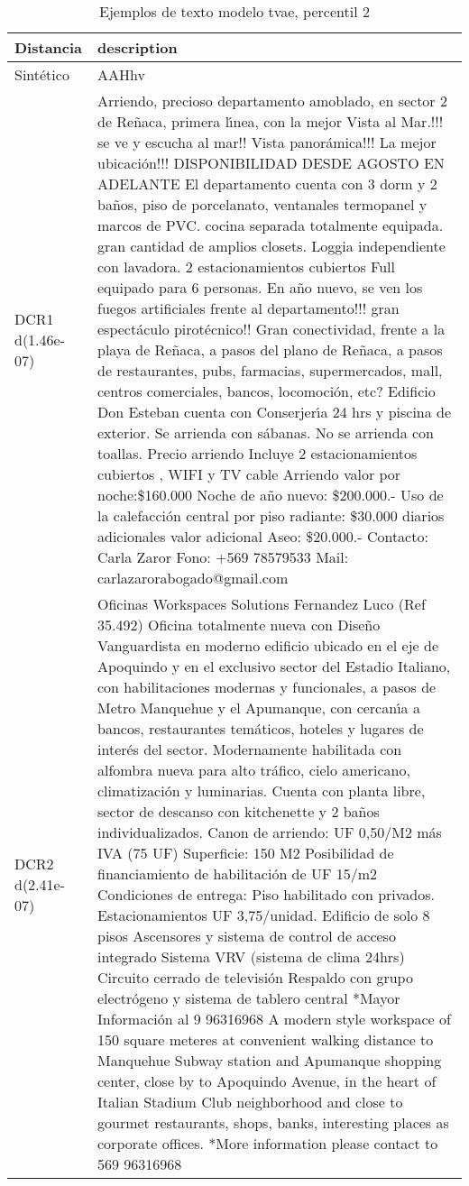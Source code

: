 \begin{table}[H]
\centering
\fontsize{10}{14}\selectfont
\caption{Ejemplos de texto modelo tvae, percentil 2}
\label{table-example-economicos-a-1-tvae-2p-text}
\begin{tabular}{|l|m{35em}|}
\hline
\rowcolor[gray]{0.8}
Distancia & description \\
\hline Sintético & AAHhv \\
\hline DCR1 d(1.46e-07) & Arriendo, precioso departamento amoblado, en sector 2 de Re\~naca, primera l{\'\i}nea, con la mejor Vista al Mar.!!! se ve y escucha al mar!! Vista panor\'amica!!! La mejor ubicaci\'on!!! DISPONIBILIDAD DESDE AGOSTO EN ADELANTE El departamento cuenta con 3 dorm y 2 ba\~nos, piso de porcelanato, ventanales termopanel y marcos de PVC. cocina separada totalmente equipada. gran cantidad de amplios closets. Loggia independiente con lavadora. 2 estacionamientos cubiertos Full equipado para 6 personas. En a\~no nuevo, se ven los fuegos artificiales frente al departamento!!! gran espect\'aculo pirot\'ecnico!! Gran conectividad, frente a la playa de Re\~naca, a pasos del plano de Re\~naca, a pasos de restaurantes, pubs, farmacias, supermercados, mall, centros comerciales, bancos, locomoci\'on, etc?  Edificio Don Esteban cuenta con Conserjer{\'\i}a 24 hrs y piscina de exterior.  Se arrienda con s\'abanas.  No se arrienda con toallas.  Precio arriendo Incluye 2 estacionamientos cubiertos , WIFI y TV cable  Arriendo valor por noche:\$160.000  Noche de a\~no nuevo: \$200.000.-  Uso de la calefacci\'on central por piso radiante: \$30.000 diarios adicionales  valor adicional Aseo: \$20.000.-  Contacto: Carla Zaror Fono: +569 78579533 Mail: carlazarorabogado@gmail.com \\
\hline DCR2 d(2.41e-07) & Oficinas Workspaces Solutions Fernandez Luco (Ref 35.492)  Oficina totalmente nueva con Dise\~no Vanguardista en moderno edificio ubicado en el eje de Apoquindo y en el exclusivo sector del Estadio Italiano, con habilitaciones modernas y funcionales, a pasos de Metro Manquehue y el Apumanque, con cercan{\'\i}a a bancos, restaurantes tem\'aticos, hoteles y lugares de inter\'es del sector. Modernamente habilitada con alfombra nueva para alto tr\'afico, cielo americano, climatizaci\'on y luminarias. Cuenta con planta libre, sector de descanso con kitchenette y 2 ba\~nos individualizados.   Canon de arriendo: UF 0,50/M2 m\'as IVA (75 UF)   Superficie: 150 M2   Posibilidad de financiamiento de habilitaci\'on de UF 15/m2   Condiciones de entrega: Piso habilitado con privados.   Estacionamientos UF 3,75/unidad.   Edificio de solo 8 pisos   Ascensores y sistema de control de acceso integrado   Sistema VRV (sistema de clima 24hrs)   Circuito cerrado de televisi\'on   Respaldo con grupo electr\'ogeno y sistema de tablero central *Mayor Informaci\'on al 9 96316968 A modern style workspace of 150 square meteres at convenient walking distance to Manquehue Subway station and Apumanque shopping center, close by to Apoquindo Avenue, in the heart of Italian Stadium Club neighborhood and close to gourmet restaurants, shops, banks, interesting places as corporate offices. *More information please contact to 569 96316968 \\
\hline
\end{tabular}
\end{table}
